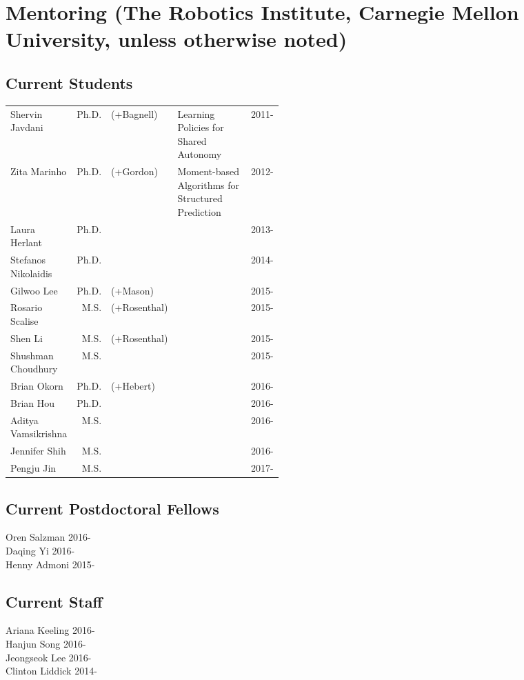 

\section{Mentoring (The Robotics Institute, Carnegie Mellon University, unless otherwise noted)} 
\subsection{Current Students}
\vspace{-1em}
\begin{center}
\begin{tabular}{lrlp{0.455\linewidth}l}
Shervin Javdani & Ph.D. &(+Bagnell) & Learning Policies for Shared Autonomy & 2011-\\
Zita Marinho & Ph.D. &(+Gordon) & Moment-based Algorithms for Structured Prediction & 2012-\\
Laura Herlant & Ph.D. & & & 2013-\\
Stefanos Nikolaidis & Ph.D. & & & 2014-\\
Gilwoo Lee & Ph.D. & (+Mason) & & 2015-\\
Rosario Scalise & M.S. & (+Rosenthal) & & 2015-\\
Shen Li & M.S. & (+Rosenthal) & & 2015-\\
Shushman Choudhury & M.S. & & & 2015-\\
Brian Okorn & Ph.D. & (+Hebert) & & 2016-\\
Brian Hou & Ph.D. & & & 2016-\\
Aditya Vamsikrishna & M.S. & & & 2016-\\
Jennifer Shih & M.S. & & & 2016-\\
Pengju Jin & M.S. & & & 2017-\\
\end{tabular}
\end{center}

\subsection{Current Postdoctoral Fellows}
\noindent
Oren Salzman \hfill 2016-\\
Daqing Yi \hfill 2016-\\
Henny Admoni \hfill 2015-\\

\subsection{Current Staff}
\noindent
Ariana Keeling \hfill 2016-\\
Hanjun Song \hfill 2016-\\
Jeongseok Lee \hfill 2016-\\
Clinton Liddick \hfill 2014-\\

